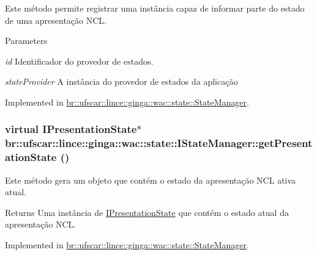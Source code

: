 Este método permite registrar uma instância capaz de informar parte do estado de uma apresentação NCL. 


\begin{DoxyParams}{Parameters}
\item[{\em id}]Identificador do provedor de estados. \item[{\em stateProvider}]A instância do provedor de estados da aplicação \end{DoxyParams}


Implemented in \hyperlink{classbr_1_1ufscar_1_1lince_1_1ginga_1_1wac_1_1state_1_1StateManager_aa02a5c2cc3e5933a60225dc1b67e75e8}{br::ufscar::lince::ginga::wac::state::StateManager}.

\hypertarget{classbr_1_1ufscar_1_1lince_1_1ginga_1_1wac_1_1state_1_1IStateManager_a8fe894ac51f00b4d3633d93135678e0c}{
\subsubsection[{getPresentationState}]{\setlength{\rightskip}{0pt plus 5cm}virtual {\bf IPresentationState}$\ast$ br::ufscar::lince::ginga::wac::state::IStateManager::getPresentationState ()}}
\label{classbr_1_1ufscar_1_1lince_1_1ginga_1_1wac_1_1state_1_1IStateManager_a8fe894ac51f00b4d3633d93135678e0c}


Este método gera um objeto que contém o estado da apresentação NCL ativa atual. 

\begin{DoxyReturn}{Returns}
Uma instância de \hyperlink{classbr_1_1ufscar_1_1lince_1_1ginga_1_1wac_1_1state_1_1IPresentationState}{IPresentationState} que contém o estado atual da apresentação NCL. 
\end{DoxyReturn}


Implemented in \hyperlink{classbr_1_1ufscar_1_1lince_1_1ginga_1_1wac_1_1state_1_1StateManager_affbdaf15d59f7df0aa182944818c3ad8}{br::ufscar::lince::ginga::wac::state::StateManager}.

